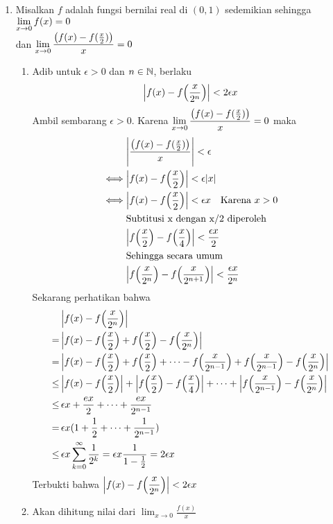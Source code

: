\documentclass{article}
\begin{document}
\begin{enumerate}[leftmargin=*, label={\arabic*}.]
\item Misalkan $f$ adalah fungsi bernilai real di $(0,1)$ sedemikian sehingga $\ds\lim_{x\to 0}f(x)=0$
\\dan $\ds\lim_{x\to 0}\frac{\oio*{f(x)-f(\frac{x}{2})}}{x}=0$
\begin{enumerate}
    \item Adib untuk $\epsilon > 0$ dan $n \in \N$, berlaku
    \[\abs*{f(x)-f\oio*{\frac{x}{2^n}}} < 2\epsilon x\]
    Ambil sembarang $\epsilon > 0$. Karena $\ds\lim_{x\to 0}\frac{\oio*{f(x)-f(\frac{x}{2})}}{x}=0$ maka
    \begin{align*}
        &\abs*{\frac{\oio*{f(x)-f(\frac{x}{2})}}{x}} < \epsilon\\
        \iff &\abs*{f(x)-f\oio*{\frac{x}{2}}} < \epsilon\abs{x}\\
        \iff &\abs*{f(x)-f\oio*{\frac{x}{2}}} < \epsilon x \quad\text{Karena $x>0$}\\
        &\text{Subtitusi x dengan x/2 diperoleh} \\
        &\abs*{f\oio*{\frac{x}{2}}-f\oio*{\frac{x}{4}}} < \frac{\epsilon x}{2} \\
        &\text{Sehingga secara umum}\\
        &\abs*{f\oio*{\frac{x}{2^n}}-f\oio*{\frac{x}{2^{n+1}}}} < \frac{\epsilon x}{2^n} 
    \end{align*} 
    Sekarang perhatikan bahwa
    \begin{align*}
        &\abs*{f(x)-f\oio*{\frac{x}{2^n}}}\\ 
        =\,&  \abs*{f(x)-f\oio*{\frac{x}{2}}+f\oio*{\frac{x}{2}}-f\oio*{\frac{x}{2^n}}} \\
        =\,&\abs*{f(x)-f\oio*{\frac{x}{2}}+f\oio*{\frac{x}{2}}+\dots-f\oio*{\frac{x}{2^{n-1}}}+f\oio*{\frac{x}{2^{n-1}}}-f\oio*{\frac{x}{2^n}}} \\
        \leq\,&\abs*{f(x)-f\oio*{\frac{x}{2}}}+\abs*{f\oio*{\frac{x}{2}}-f\oio*{\frac{x}{4}}}+\dots+\abs*{f\oio*{\frac{x}{2^{n-1}}}-f\oio*{\frac{x}{2^n}}}\\
        \leq\,& \epsilon x + \frac{ex}{2} + \dots + \frac{ex}{2^{n-1}}\\
        =\,&\epsilon x(1+\frac{1}{2}+\dots+\frac{1}{2^{n-1}})\\
        \leq\,& \epsilon x \sum_{k=0}^{\infty}\frac{1}{2^k} = \epsilon x \frac{1}{1-\frac{1}{2}} = 2\epsilon x
    \end{align*}
    Terbukti bahwa $\ds\abs*{f(x)-f\oio*{\frac{x}{2^n}}} < 2\epsilon x$
    \item Akan dihitung nilai dari $\lim_{x\to 0}\frac{f(x)}{x}$

\end{enumerate}
\end{enumerate}
\end{document}
